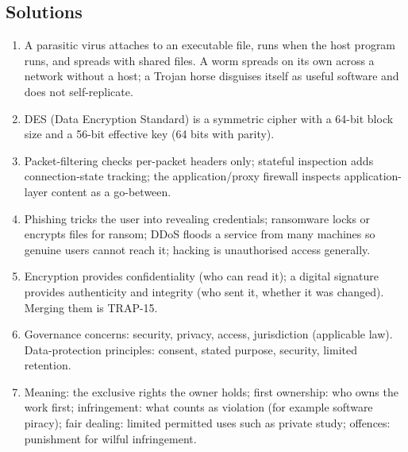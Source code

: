 \documentclass[11pt]{article}
\begin{document}
\subsection*{Solutions}
\begingroup\small
\begin{enumerate}[label=\arabic*.]
  \item A parasitic virus attaches to an executable file, runs when the host
    program runs, and spreads with shared files. A worm spreads on its own
    across a network without a host; a Trojan horse disguises itself as useful
    software and does not self-replicate.
  \item DES (Data Encryption Standard) is a symmetric cipher with a 64-bit
    block size and a 56-bit effective key (64 bits with parity).
  \item Packet-filtering checks per-packet headers only; stateful inspection
    adds connection-state tracking; the application/proxy firewall inspects
    application-layer content as a go-between.
  \item Phishing tricks the user into revealing credentials; ransomware locks
    or encrypts files for ransom; DDoS floods a service from many machines so
    genuine users cannot reach it; hacking is unauthorised access generally.
  \item Encryption provides confidentiality (who can read it); a digital
    signature provides authenticity and integrity (who sent it, whether it was
    changed). Merging them is TRAP-15.
  \item Governance concerns: security, privacy, access, jurisdiction
    (applicable law). Data-protection principles: consent, stated purpose,
    security, limited retention.
  \item Meaning: the exclusive rights the owner holds; first ownership: who
    owns the work first; infringement: what counts as violation (for example
    software piracy); fair dealing: limited permitted uses such as private
    study; offences: punishment for wilful infringement.
\end{enumerate}
\endgroup
\end{document}
